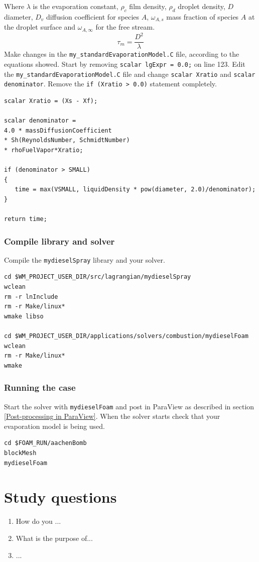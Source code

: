 \documentclass{report}
\begin{document}
Where $\lambda$ is the evaporation constant, $\rho_{c}$ film density, $\rho_{d}$ droplet density, $D$ diameter, $D_v$ diffusion coefficient for species $A$, $\omega_{A,s}$ mass fraction of species $A$ at the droplet surface and $\omega_{A,\infty}$ for the free stream.  
\begin{equation}
\label{taum}
	\tau_{m}=\frac{D^{2}}{\lambda}
\end{equation}
Make changes in the \verb+my_standardEvaporationModel.C+ file, according to the equations showed. Start by removing \verb+scalar lgExpr = 0.0;+ on line 123.
\newline \noindent
Edit the \verb+my_standardEvaporationModel.C+ file and change \verb+scalar Xratio+ and \verb+scalar denominator+. 
\newline
\noindent
Remove the \verb+if (Xratio > 0.0)+ statement completely.
\begin{verbatim}
scalar Xratio = (Xs - Xf);

scalar denominator =
4.0 * massDiffusionCoefficient
* Sh(ReynoldsNumber, SchmidtNumber)
* rhoFuelVapor*Xratio;

if (denominator > SMALL)
{
   time = max(VSMALL, liquidDensity * pow(diameter, 2.0)/denominator);
}

return time;
\end{verbatim}
\subsection{Compile library and solver}
Compile the \verb+mydieselSpray+ library and your solver. 
\begin{verbatim}
cd $WM_PROJECT_USER_DIR/src/lagrangian/mydieselSpray
wclean
rm -r lnInclude
rm -r Make/linux*
wmake libso
 
cd $WM_PROJECT_USER_DIR/applications/solvers/combustion/mydieselFoam
wclean
rm -r Make/linux*
wmake
\end{verbatim}
\subsection{Running the case}
Start the solver with \verb+mydieselFoam+ and post in ParaView as described in section \ref{Post-processing in ParaView}.
When the solver starts check that your evaporation model is being used.
\begin{verbatim} 
cd $FOAM_RUN/aachenBomb
blockMesh
mydieselFoam  
\end{verbatim}

\chapter*{Study questions}
\begin{enumerate}
\item How do you ...
\item What is the purpose of...
\item ...
\end{enumerate}
\end{document}
